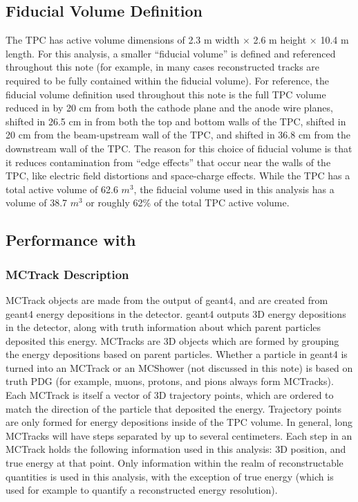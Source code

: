 \subsection{Fiducial Volume Definition}\label{fidvol_section}
The {\ub} TPC has active volume dimensions of 2.3 m width $\times$ 2.6 m height $\times$ 10.4 m length. For this analysis, a smaller ``fiducial volume'' is defined and referenced throughout this note (for example, in many cases reconstructed tracks are required to be fully contained within the fiducial volume). For reference, the fiducial volume definition used throughout this note is the full TPC volume reduced in by 20 cm from both the cathode plane and the anode wire planes, shifted in 26.5 cm in from both the top and bottom walls of the TPC, shifted in 20 cm from the beam-upstream wall of the TPC, and shifted in 36.8 cm from the downstream wall of the TPC. The reason for this choice of fiducial volume is that it reduces contamination from ``edge effects'' that occur near the walls of the TPC, like electric field distortions and space-charge effects. While the TPC has a total active volume of 62.6 $m^3$, the fiducial volume used in this analysis has a volume of 38.7 $m^3$ or roughly 62\% of the total TPC active volume.


\subsection{Performance with }\label{singlemu_mctrack_performance_section}


\subsubsection{MCTrack Description}\label{MCTrack_section}
{\sc MCTrack} objects are made from the output of {\sc geant}4, and are created from {\sc geant}4 energy depositions in the detector. {\sc geant}4 outputs 3D energy depositions in the detector, along with truth information about which parent particles deposited this energy. {\sc MCTracks} are 3D objects which are formed by grouping the energy depositions based on parent particles. Whether a particle in {\sc geant}4 is turned into an {\sc MCTrack} or an {\sc MCShower} (not discussed in this note) is based on truth PDG (for example, muons, protons, and pions always form {\sc MCTracks}).\\

Each {\sc MCTrack} is itself a vector of 3D trajectory points, which are ordered to match the direction of the particle that deposited the energy. Trajectory points are only formed for energy depositions inside of the TPC volume. In general, long {\sc MCTrack}s will have steps separated by up to several centimeters. Each step in an {\sc MCTrack} holds the following information used in this analysis: 3D position, and true energy at that point. Only information within the realm of reconstructable quantities is used in this analysis, with the exception of true energy (which is used for example to quantify a reconstructed energy resolution).\\

